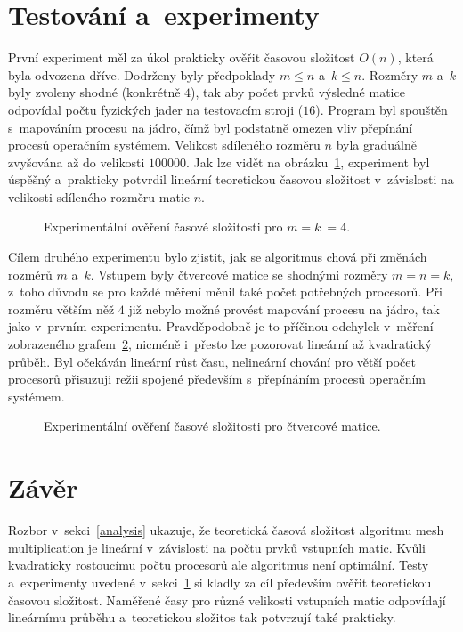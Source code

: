 \documentclass[a4paper, 12pt]{article}[24.4.2015]
\begin{document}
\section{Testování a~experimenty} \label{experiments}
První experiment měl za úkol prakticky ověřit časovou složitost \(O(n)\), která byla odvozena dříve. Dodrženy byly předpoklady \(m \leq n\) a~\(k \leq n\). Rozměry \(m\) a~\(k\) byly zvoleny shodné (konkrétně \(4\)), tak aby počet prvků výsledné matice odpovídal počtu fyzických jader na testovacím stroji (\(16\)). Program byl spouštěn s~mapováním procesu na jádro, čímž byl podstatně omezen vliv přepínání procesů operačním systémem. Velikost sdíleného rozměru \(n\) byla graduálně zvyšována až do velikosti \(100000\). Jak lze vidět na obrázku~\ref{fig:measurement_n}, experiment byl úspěšný a~prakticky potvrdil lineární teoretickou časovou složitost v~závislosti na velikosti sdíleného rozměru matic \(n\).
\begin{figure}
\centering

\caption{Experimentální ověření časové složitosti pro \(m = k~= 4\).}
\label{fig:measurement_n}
\end{figure}

Cílem druhého experimentu bylo zjistit, jak se algoritmus chová při změnách rozměrů \(m\) a~\(k\). Vstupem byly čtvercové matice se shodnými rozměry \(m = n = k\), z~toho důvodu se pro každé měření měnil také počet potřebných procesorů. Při rozměru větším něž \(4\) již nebylo možné provést mapování procesu na jádro, tak jako v~prvním experimentu. Pravděpodobně je to příčinou odchylek v~měření zobrazeného grafem~\ref{fig:measurement_mk}, nicméně i~přesto lze pozorovat lineární až kvadratický průběh. Byl očekáván lineární růst času, nelineární chování pro větší počet procesorů přisuzuji režii spojené především s~přepínáním procesů operačním systémem.
\begin{figure}
\centering

\caption{Experimentální ověření časové složitosti pro čtvercové matice.}
\label{fig:measurement_mk}
\end{figure}

\section{Závěr}\label{conclusion}
Rozbor v~sekci~\ref{analysis} ukazuje, že teoretická časová složitost algoritmu mesh multiplication je lineární v~závislosti na počtu prvků vstupních matic. Kvůli kvadraticky rostoucímu počtu procesorů ale algoritmus není optimální. Testy a~experimenty uvedené v~sekci~\ref{experiments} si kladly za cíl především ověřit teoretickou časovou složitost. Naměřené časy pro různé velikosti vstupních matic odpovídají lineárnímu průběhu a~teoretickou složitos tak potvrzují také prakticky.
\end{document}
